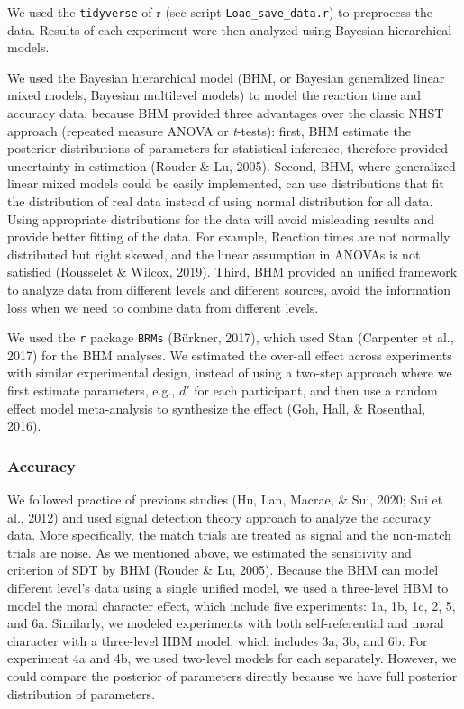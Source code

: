 \documentclass[
  man]{apa6}
\begin{document}
We used the \texttt{tidyverse} of r (see script \texttt{Load\_save\_data.r}) to preprocess the data. Results of each experiment were then analyzed using Bayesian hierarchical models.

We used the Bayesian hierarchical model (BHM, or Bayesian generalized linear mixed models, Bayesian multilevel models) to model the reaction time and accuracy data, because BHM provided three advantages over the classic NHST approach (repeated measure ANOVA or \emph{t}-tests): first, BHM estimate the posterior distributions of parameters for statistical inference, therefore provided uncertainty in estimation (Rouder \& Lu, 2005). Second, BHM, where generalized linear mixed models could be easily implemented, can use distributions that fit the distribution of real data instead of using normal distribution for all data. Using appropriate distributions for the data will avoid misleading results and provide better fitting of the data. For example, Reaction times are not normally distributed but right skewed, and the linear assumption in ANOVAs is not satisfied (Rousselet \& Wilcox, 2019). Third, BHM provided an unified framework to analyze data from different levels and different sources, avoid the information loss when we need to combine data from different levels.

We used the \texttt{r} package \texttt{BRMs} (Bürkner, 2017), which used Stan (Carpenter et al., 2017) for the BHM analyses. We estimated the over-all effect across experiments with similar experimental design, instead of using a two-step approach where we first estimate parameters, e.g., \(d'\) for each participant, and then use a random effect model meta-analysis to synthesize the effect (Goh, Hall, \& Rosenthal, 2016).

\hypertarget{accuracy}{%
\subsubsection{Accuracy}\label{accuracy}}

We followed practice of previous studies (Hu, Lan, Macrae, \& Sui, 2020; Sui et al., 2012) and used signal detection theory approach to analyze the accuracy data. More specifically, the match trials are treated as signal and the non-match trials are noise. As we mentioned above, we estimated the sensitivity and criterion of SDT by BHM (Rouder \& Lu, 2005). Because the BHM can model different level's data using a single unified model, we used a three-level HBM to model the moral character effect, which include five experiments: 1a, 1b, 1c, 2, 5, and 6a. Similarly, we modeled experiments with both self-referential and moral character with a three-level HBM model, which includes 3a, 3b, and 6b. For experiment 4a and 4b, we used two-level models for each separately. However, we could compare the posterior of parameters directly because we have full posterior distribution of parameters.
\end{document}
